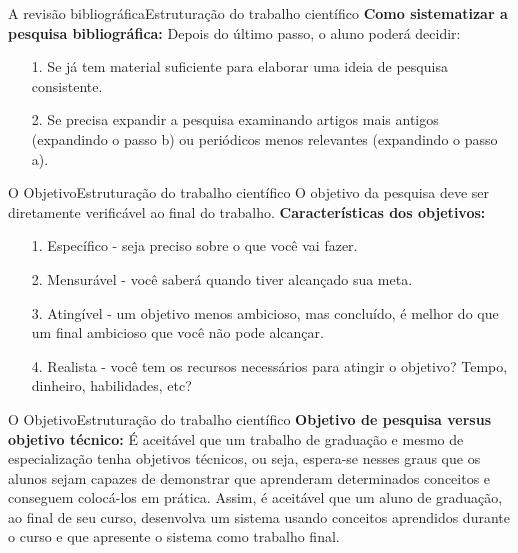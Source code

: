 \documentclass[t]{beamer}
\begin{document}

\begin{ftst}{A revisão bibliográfica}{Estruturação do trabalho científico}
\justifying
\textbf{Como sistematizar a pesquisa bibliográfica:}
\vone
Depois do último passo, o aluno poderá decidir:
\vone
\begin{enumerate}
    \item[1.] Se já tem material suficiente para elaborar uma ideia de pesquisa consistente.
    \item[2.] Se precisa expandir a pesquisa examinando artigos mais antigos (expandindo o passo b) ou periódicos menos relevantes (expandindo o passo a).

\end{enumerate}


\end{ftst}



\begin{ftst}{O Objetivo}{Estruturação do trabalho científico}
\justifying
O objetivo da pesquisa deve ser diretamente verificável ao final do trabalho.
\vone
\textbf{Características dos objetivos:}
\vone
\begin{itemize}
    \item[1.] Específico - seja preciso sobre o que você vai fazer.
    \item[2.] Mensurável - você saberá quando tiver alcançado sua meta.
    \item[3.] Atingível - um objetivo menos ambicioso, mas concluído, é melhor do que um final ambicioso que você não pode alcançar.
    \item[4.] Realista - você tem os recursos necessários para atingir o objetivo? Tempo, dinheiro, habilidades, etc?
\end{itemize}

\end{ftst}


\begin{ftst}{O Objetivo}{Estruturação do trabalho científico}
\justifying
\textbf{Objetivo de pesquisa versus objetivo técnico:}
\vone
É aceitável que um trabalho de graduação e mesmo de especialização tenha objetivos técnicos, ou seja, espera-se nesses graus que os alunos sejam capazes de demonstrar que aprenderam determinados conceitos e conseguem colocá-los em prática. 
\vone
Assim, é aceitável que um aluno de graduação, ao final de seu curso, desenvolva um sistema usando conceitos aprendidos durante o curso e que apresente o sistema como trabalho final. 

\end{ftst}
\end{document}
